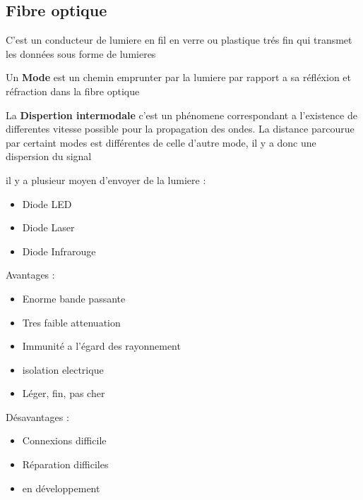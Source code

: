 \documentclass[12pt]{article}
\begin{document}
	\subsection{Fibre optique}
		C'est un conducteur de lumiere en fil en verre ou plastique trés fin qui transmet les données sous forme de lumieres
		
		Un \textbf{Mode} est un chemin emprunter par la lumiere par rapport a sa réfléxion et réfraction dans la fibre optique
		
		La \textbf{Dispertion intermodale} c'est un phénomene correspondant a l'existence de differentes vitesse possible pour la propagation des ondes. La distance parcourue par certaint modes est différentes de celle d'autre mode, il y a donc une dispersion du signal
		
		il y a plusieur moyen d'envoyer de la lumiere :
		\begin{itemize}
			\item Diode LED
			\item Diode Laser
			\item Diode Infrarouge
		\end{itemize}
		
		Avantages :
		\begin{itemize}
			\item Enorme bande passante
			\item Tres faible attenuation
			\item Immunité a l'égard des rayonnement
			\item isolation electrique
			\item Léger, fin, pas cher
		\end{itemize}
		
		Désavantages :
		\begin{itemize}
			\item Connexions difficile
			\item Réparation difficiles
			\item en développement
		\end{itemize}
		
\end{document}
